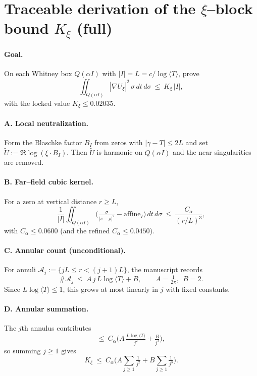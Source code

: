 
\section*{Traceable derivation of the $\xi$--block bound $K_{\xi}$ (full)}

\paragraph{Goal.} On each Whitney box $Q(\alpha I)$ with $|I|=L=c/\log\langle T\rangle$, prove
\[ \iint_{Q(\alpha I)} |\nabla U_{\xi}|^2\,\sigma\,dt\,d\sigma\ \le\ K_{\xi}\,|I|, \]
with the locked value $K_{\xi}\le 0.02035$.

\paragraph{A. Local neutralization.} Form the Blaschke factor $B_I$ from zeros with $|\gamma-T|\le 2L$ and set $\widetilde U:=\Re\log(\xi\cdot B_I)$. Then $\widetilde U$ is harmonic on $Q(\alpha I)$ and the near singularities are removed.

\paragraph{B. Far–field cubic kernel.} For a zero at vertical distance $r\ge L$,
\[ \frac{1}{|I|}\iint_{Q(\alpha I)}\Big(\tfrac{\sigma}{|s-\rho|^2}-\mathrm{affine}_I\Big)\,dt\,d\sigma\ \le\ \frac{C_\alpha}{(r/L)^3},\]
with $C_\alpha\le 0.0600$ (and the refined $C_\alpha\le 0.0450$).

\paragraph{C. Annular count (unconditional).} For annuli $\mathcal A_j:=\{jL\le r<(j+1)L\}$, the manuscript records
\[ \#\mathcal A_j\ \le\ A\,j\,L\log\langle T\rangle + B,\qquad A=\tfrac{1}{2\pi},\ \ B=2. \]
Since $L\log\langle T\rangle\le 1$, this grows at most linearly in $j$ with fixed constants.

\paragraph{D. Annular summation.} The $j$th annulus contributes
\[ \le\ C_\alpha\Big( A\,\tfrac{L\log\langle T\rangle}{j^2} + \tfrac{B}{j^3}\Big), \]
so summing $j\ge1$ gives
\[ K_{\xi}\ \le\ C_\alpha\Big( A\sum_{j\ge1}\tfrac{1}{j^2} + B\sum_{j\ge1}\tfrac{1}{j^3}\Big). \]

